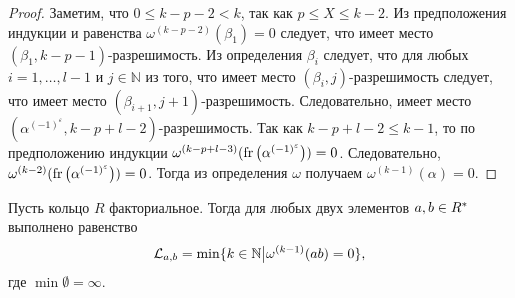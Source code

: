 \documentclass[_00_dissertation.tex]{subfiles}
\begin{document}
\begin{proof}
    Заметим, что $0 \le k-p-2 < k$, так как $p \le X \le k-2$.
    Из предположения индукции и равенства $\omega^{(k-p-2)}(\beta_1) = 0$ следует, что имеет место $(\beta_1, k-p-1)$-разрешимость.
    Из определения $\beta_i$ следует, что для любых $i = 1, \dots, l-1$ и $j \in \mathbb{N}$ из того, что имеет место $(\beta_i, j)$-разрешимость следует, что имеет место $(\beta_{i+1}, j+1)$-разрешимость.
    Следовательно, имеет место $(\alpha^{(-1)^{\varepsilon}}, k-p+l-2)$-разрешимость.
    Так как $k - p + l - 2 \le k - 1$, то по предположению индукции $\omega^{(k-p+l-3)}(\textrm{fr}\left(\alpha^{(-1)^{\varepsilon}}\right)) = 0$.
    Следовательно, $\omega^{(k-2)}(\textrm{fr}\left(\alpha^{(-1)^{\varepsilon}}\right)) = 0$.
    Тогда из определения $\omega$ получаем $\omega^{(k-1)}(\alpha) = 0$.
\end{proof}

\begin{lemma}\label{lemma:euclidean_algorithm_and_minima}
    Пусть кольцо $R$ факториальное.
    Тогда для любых двух элементов $a, b \in R^{*}$ выполнено равенство
    \begin{equation*}
        \mathcal{L}_{a, b} = \min\{
            k \in \mathbb{N} \big| \omega^{(k-1)}(a\/b) = 0
        \},
    \end{equation*}
    где $\min \emptyset = \infty$.
\end{lemma}
\end{document}
